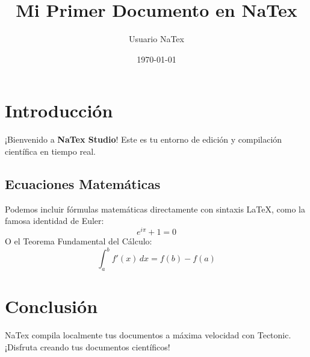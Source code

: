 \documentclass[12pt, letterpaper]{article}
\title{\textbf{Mi Primer Documento en NaTex}}
\author{Usuario NaTex}
\date{\today}
\begin{document}
\maketitle

\section{Introducción}
¡Bienvenido a \textbf{NaTex Studio}! Este es tu entorno de edición y compilación científica en tiempo real.

\subsection{Ecuaciones Matemáticas}
Podemos incluir fórmulas matemáticas directamente con sintaxis LaTeX, como la famosa identidad de Euler:
\begin{equation}
e^{i\pi} + 1 = 0
\end{equation}
O el Teorema Fundamental del Cálculo:
\begin{equation}
\int_a^b f'(x)\,dx = f(b) - f(a)
\end{equation}

\section{Conclusión}
NaTex compila localmente tus documentos a máxima velocidad con Tectonic. ¡Disfruta creando tus documentos científicos!
\end{document}
